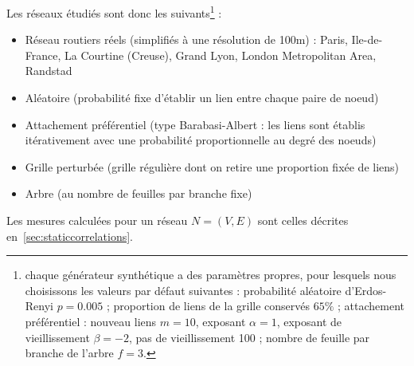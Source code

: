 Les réseaux étudiés sont donc les suivants\footnote{chaque générateur synthétique a des paramètres propres, pour lesquels nous choisissons les valeurs par défaut suivantes : probabilité aléatoire d'Erdos-Renyi $p=0.005$ ; proportion de liens de la grille conservés $65\%$ ; attachement préférentiel : nouveau liens $m=10$, exposant $\alpha=1$, exposant de vieillissement $\beta = -2$, pas de vieillissement 100 ; nombre de feuille par branche de l'arbre $f=3$.} : 
\begin{itemize}
\item Réseau routiers réels (simplifiés à une résolution de 100m) : Paris, Ile-de-France, La Courtine (Creuse), Grand Lyon, London Metropolitan Area, Randstad
\item Aléatoire (probabilité fixe d'établir un lien entre chaque paire de noeud)
\item Attachement préférentiel (type Barabasi-Albert : les liens sont établis itérativement avec une probabilité proportionnelle au degré des noeuds)
\item Grille perturbée (grille régulière dont on retire une proportion fixée de liens)
\item Arbre (au nombre de feuilles par branche fixe)
\end{itemize}

Les mesures calculées pour un réseau $N=(V,E)$ sont celles décrites en~\ref{sec:staticcorrelations}.




